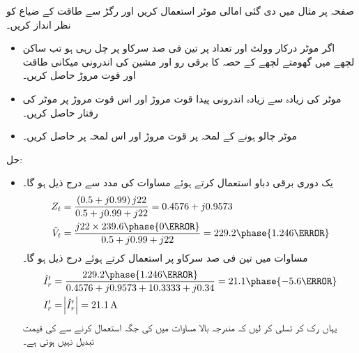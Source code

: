 صفحہ  پر مثال   میں دی گئی امالی موٹر استعمال کریں اور رگڑ سے طاقت کے ضیاع کو نظر انداز کریں۔
\begin{itemize}
\item
اگر موٹر درکار وولٹ اور تعداد  پر تین فی صد سرکاو پر چل رہی ہو تب  ساکن لچھے میں گھومتے لچھے کے حصہ کا برقی رو  اور مشین کی اندرونی میکانی طاقت اور قوت مروڑ حاصل کریں۔
\item
موٹر کی زیادہ سے زیادہ اندرونی پیدا قوت مروڑ اور اس قوت مروڑ پر موٹر کی رفتار حاصل کریں۔
\item
موٹر چالو ہونے کے لمحہ پر قوت مروڑ اور اس لمحہ پر   حاصل کریں۔ 
\end{itemize}

حل:
\begin{itemize}
\item
 یک دوری  برقی دباو   استعمال کرتے ہوئے مساوات   کی مدد سے درج ذیل ہو گا۔
\begin{align*}
Z_t&=\frac{\left(0.5+j 0.99 \right) j 22}{0.5+j 0.99+j 22}=0.4576+j 0.9573\\
\hat{V}_t&=\frac{j 22 \times 239.6 \phase{0\degree}}{0.5+j 0.99+j 22}=229.2\phase{1.246\degree}
\end{align*}
مساوات   میں  تین فی صد سرکاو پر   استعمال کرتے ہوئے درج ذیل ہو گا۔
\begin{align*}
\hat{I}_r'&=\frac{229.2 \phase{1.246\degree}}{0.4576+j 0.9573+10.3333+j 0.34}=21.1\phase{-5.6\degree}\\
I_r'&=\abs{\hat{I}_r'}=\SI{21.1}{\ampere}
\end{align*}
یہاں رک کر تسلی کر لیں کہ مندرجہ بالا مساوات میں  کی جگہ  استعمال کرنے سے  کی  قیمت تبدیل نہیں ہوتی ہے۔


\end{itemize}
